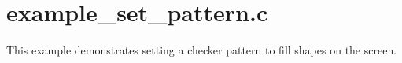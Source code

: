 \section{example\_\-set\_\-pattern.c}


This example demonstrates setting a checker pattern to fill shapes on the screen.

